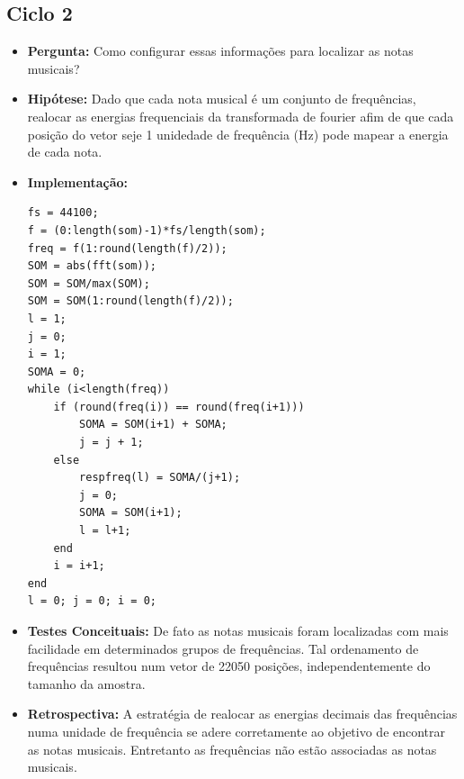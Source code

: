\subsection{Ciclo 2}
\begin{itemize}
\item \textbf{Pergunta:} Como configurar essas informações para localizar as notas musicais?
\item \textbf{Hipótese:} Dado que cada nota musical é um conjunto de frequências, realocar as energias frequenciais da transformada de fourier afim de que cada posição do vetor seje 1 unidedade de frequência (Hz) pode mapear a energia de cada nota.
\item \textbf{Implementação:} 
\begin{lstlisting}
fs = 44100;
f = (0:length(som)-1)*fs/length(som);
freq = f(1:round(length(f)/2));
SOM = abs(fft(som));
SOM = SOM/max(SOM);
SOM = SOM(1:round(length(f)/2));
l = 1;
j = 0;
i = 1;
SOMA = 0; 
while (i<length(freq))
    if (round(freq(i)) == round(freq(i+1)))
        SOMA = SOM(i+1) + SOMA;
        j = j + 1;
    else
        respfreq(l) = SOMA/(j+1);
        j = 0;
        SOMA = SOM(i+1);
        l = l+1;
    end
    i = i+1;
end
l = 0; j = 0; i = 0;
\end{lstlisting}
\item \textbf{Testes Conceituais:} De fato as notas musicais foram localizadas com mais facilidade em determinados grupos de frequências. Tal ordenamento de frequências resultou num vetor de 22050 posições, independentemente do tamanho da amostra.
\item \textbf{Retrospectiva:} A estratégia de realocar as energias decimais das frequências numa unidade de frequência se adere corretamente ao objetivo de encontrar as notas musicais. Entretanto as frequências não estão associadas as notas musicais.
\end{itemize}

